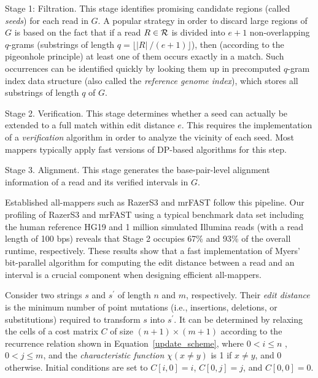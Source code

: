 \begin{description}

\item{Stage 1: Filtration.} This stage identifies promising candidate
  regions (called {\em seeds}) for each read in $G$. A popular
  strategy in order to discard large regions of $G$ is based on the
  fact that if a read $R \in {\cal R}$ is divided into $e+1$
  non-overlapping $q$-grams (substrings of length $q = \lfloor \lvert
  R\rvert\ /(e+1) \rfloor$), then (according to the pigeonhole
  principle) at least one of them occurs exactly in a match. Such
  occurrences can be identified quickly by looking them up in
  precomputed $q$-gram index data structure (also called the {\em
    reference genome index}), which stores all substrings of length
  $q$ of $G$.

\item{Stage 2. Verification.} This stage determines whether a seed can
  actually be extended to a full match within edit distance $e$. This
  requires the implementation of a {\em verification} algorithm in
  order to analyze the vicinity of each seed. Most mappers typically
  apply fast versions of DP-based algorithms for this step.

\item{Stage 3. Alignment.} This stage generates the base-pair-level
  alignment information of a read and its verified intervals in $G$.

\end{description}

Established all-mappers such as RazerS3 \cite{razers3} and mrFAST
\cite{mrfast} follow this pipeline. Our profiling of RazerS3 and
mrFAST using a typical benchmark data set including the human
reference HG19 and 1 million simulated Illumina reads (with a read
length of 100 bps) reveals that Stage 2 occupies 67\% and 93\% of the
overall runtime, respectively. These results show that a fast implementation
of Myers' bit-parallel algorithm for computing the edit distance
between a read and an interval is a crucial component when designing
efficient all-mappers.

Consider two strings $s$ and $s^\prime$ of length $n$ and $m$,
respectively. Their {\em edit distance} is the minimum number of point
mutations (i.e., insertions, deletions, or substitutions) required to
transform $s$ into $s^\prime$. It can be determined by relaxing the
cells of a cost matrix $C$ of size $(n+1) \times (m+1)$ according to
the recurrence relation shown in Equation~\ref{update_scheme}, where
$0 < i \le n$ , $0 < j \le m$, and the {\em characteristic function}
$\chi (x \ne y)$ is 1 if $x \ne y$, and 0 otherwise. Initial
conditions are set to $C[i,0] = i$, $C[0,j] = j$, and $C[0,0] = 0$.

